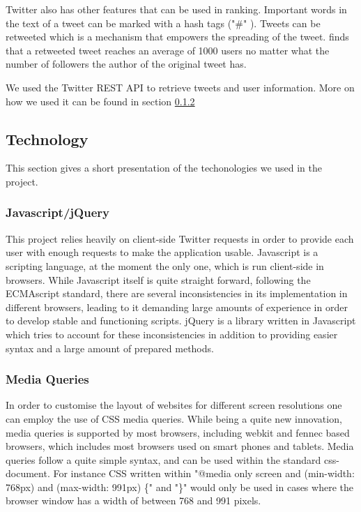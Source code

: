Twitter also has other features that can be used in ranking. Important words in the text of a tweet can be marked with a hash tags ("\#" ). Tweets can be retweeted which is a mechanism that empowers the spreading of the tweet. \citep{Kwak2010} finds that a retweeted tweet reaches an average of 1000 users no matter what the number of followers the author of the original tweet has. 

We used the Twitter REST API to retrieve tweets and user information. More on how we used it can be found in section \ref{} \nameref{} 

\subsection{Technology}
This section gives a short presentation of the techonologies we used in the project. 

\subsubsection{Javascript/jQuery} %
This project relies heavily on client-side Twitter requests in order to provide each user with enough requests to make the application usable. Javascript is a scripting language, at the moment the only one, which is run client-side in browsers. While Javascript itself is quite straight forward, following the ECMAscript standard, there are several inconsistencies in its implementation in different browsers, leading to it demanding large amounts of experience in order to develop stable and functioning scripts. jQuery is a library written in Javascript which tries to account for these inconsistencies in addition to providing easier syntax and a large amount of prepared methods.

\subsubsection{Media Queries} %
In order to customise the layout of websites for different screen resolutions one can employ the use of CSS media queries. While being a quite new innovation, media queries is supported by most browsers, including webkit and fennec based browsers, which includes most browsers used on smart phones and tablets. Media queries follow a quite simple syntax, and can be used within the standard css-document. For instance CSS written within "@media only screen and (min-width: 768px) and (max-width: 991px) \{" and "\}" would only be used in cases where the browser window has a width of between 768 and 991 pixels. 

